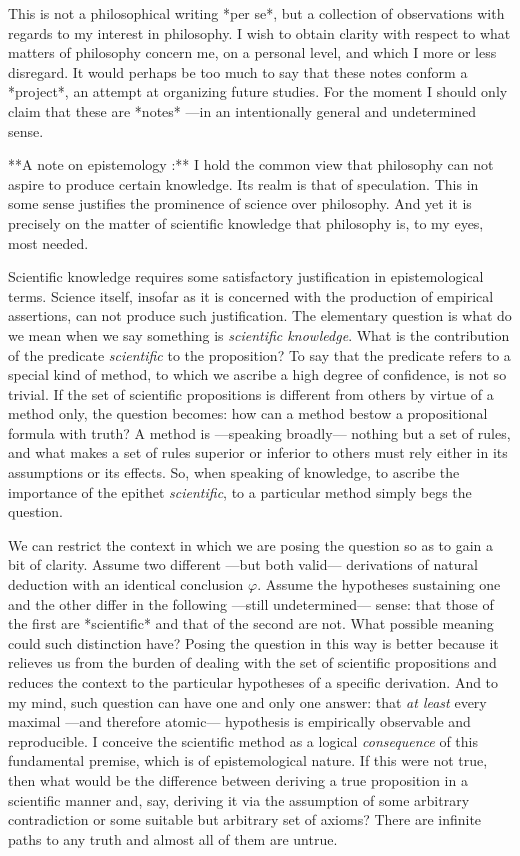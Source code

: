\documentclass[a4paper]{article}
\begin{document}
    
This is not a philosophical writing *per se*, but a collection of
observations with regards to my interest in philosophy. I wish to obtain
clarity with respect to what matters of philosophy concern me, on a personal
level, and which I more or less disregard. It would perhaps be too much to
say that these notes conform a *project*, an attempt at organizing
future studies. For the moment I should only claim that these are
*notes* —in an intentionally general and undetermined sense.

**A note on epistemology :** I hold the common view that philosophy can not
aspire to produce certain knowledge. Its realm is that of speculation. This in
some sense justifies the prominence of science over philosophy. And yet it is
precisely on the matter of scientific knowledge that philosophy is, to my eyes,
most needed.

Scientific knowledge requires some satisfactory justification in epistemological
terms. Science itself, insofar as it is concerned with the production of
empirical assertions, can not produce such justification. The elementary
question is what do we mean when we say something is \textit{scientific
knowledge}. What is the contribution of the predicate \textit{scientific} to the
proposition? To say that the predicate refers to a special kind of method, to
which we ascribe a high degree of confidence, is not so trivial. If the set of
scientific propositions is different from others by virtue of a method only, the
question becomes: how can a method bestow a propositional formula with truth? A
method is ---speaking broadly--- nothing but a set of rules, and what makes a
set of rules superior or inferior to others must rely either in its assumptions
or its effects. So, when speaking of knowledge, to ascribe the importance of the
epithet \textit{scientific}, to a particular method simply begs the question.

We can restrict the context in which we are posing the question so as to gain a
bit of clarity. Assume two different ---but both valid--- derivations of natural
deduction with an identical conclusion $\varphi$. Assume the hypotheses
sustaining one and the other differ in the following —still undetermined— sense:
that those of the first are *scientific* and that of the second are not. What
possible meaning could such distinction have? Posing the question in this way is
better because it relieves us from the burden of dealing with the set of
scientific propositions and reduces the context to the particular hypotheses of
a specific derivation. And to my mind, such question can have one and only one
answer: that \textit{at least} every maximal ---and therefore atomic---
hypothesis is empirically observable and reproducible. I conceive the
scientific method as a logical \textit{consequence} of this fundamental
premise, which is of epistemological nature. If this were not true, then what
would be the difference between deriving a true proposition in a scientific
manner and, say, deriving it via the assumption of some arbitrary contradiction
or some suitable but arbitrary set of axioms? There are infinite paths to any
truth and almost all of them are untrue.
\end{document}

